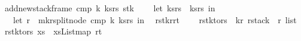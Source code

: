 \begin{isabellebody}
{\isachardoublequoteopen}add{\isacharunderscore}new{\isacharunderscore}stack{\isacharunderscore}frame\ cmp\ k\ ks{\isacharunderscore}rs\ stk\ {\isacharequal}\ {\isacharparenleft}\isanewline
\ \ let\ {\isacharparenleft}ks{\isacharcomma}rs{\isacharparenright}\ {\isacharequal}\ ks{\isacharunderscore}rs\ in\isanewline
\ \ let\ r\ {\isacharequal}\ mk{\isacharunderscore}rsplit{\isacharunderscore}node\ cmp\ k\ {\isacharparenleft}ks{\isacharcomma}rs{\isacharparenright}\ in\isanewline
\ \ {\isacharparenleft}r{\isacharhash}stk{\isacharcomma}r{\isacharbar}{\isachargreater}r{\isacharunderscore}t{\isacharparenright}\ {\isacharparenright}{\isachardoublequoteclose}\ \ \isanewline
\isanewline
\isanewline
{}\isamarkupfalse%
\ r{\isacharunderscore}stk{\isacharunderscore}to{\isacharunderscore}rs\ {\isacharcolon}{\isacharcolon}\ {\isachardoublequoteopen}{\isacharparenleft}{\isacharprime}k{\isacharcomma}{\isacharprime}r{\isacharparenright}\ rstack\ {\isasymRightarrow}\ {\isacharprime}r\ list{\isachardoublequoteclose}\ \ \isanewline
{\isachardoublequoteopen}r{\isacharunderscore}stk{\isacharunderscore}to{\isacharunderscore}rs\ xs\ {\isacharequal}\ {\isacharparenleft}xs{\isacharbar}{\isachargreater}List{\isachardot}map\ r{\isacharunderscore}t{\isacharparenright}{\isachardoublequoteclose}\isanewline
%
\isadelimtheory
\isanewline
%
\endisadelimtheory
%
\isatagtheory
{}\isamarkupfalse%
%
\endisatagtheory
{\isafoldtheory}%
%
\isadelimtheory
%
\endisadelimtheory
\end{isabellebody}%
